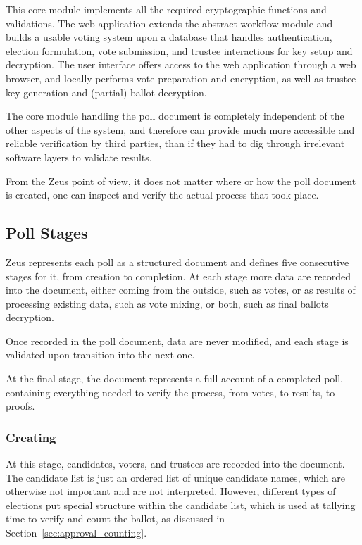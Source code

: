 \documentclass[letterpaper,10pt]{article}
\begin{document}
This core module implements all the required cryptographic functions and
validations. The web application extends the abstract workflow module
and builds a usable voting system upon a database
that handles authentication, election formulation, vote submission,
and trustee interactions for key setup and decryption.
The user interface offers access to the web application through
a web browser, and locally performs vote preparation and encryption,
as well as trustee key generation and (partial) ballot decryption.

The core module handling the poll document is completely independent of
the other aspects of the system, and therefore can provide much more
accessible and reliable verification by third parties, than if they
had to dig through irrelevant software layers to validate results.

From the Zeus point of view, it does not matter where or how the poll
document is created, one can inspect and verify the actual process
that took place.

\subsection{Poll Stages}
Zeus represents each poll as a structured document
and defines five consecutive stages for it, from creation to completion.
At each stage more data are recorded into the document,
either coming from the outside, such as votes,
or as results of processing existing data, such as vote mixing,
or both, such as final ballots decryption.

Once recorded in the poll document, data are never modified,
and each stage is validated upon transition into the next one.

At the final stage,
the document represents a full account of a completed poll,
containing everything needed to verify the process,
from votes, to results, to proofs.

\subsubsection{Creating}
\label{sec:creating}

At this stage, candidates, voters, and trustees
are recorded into the document.
The candidate list is just an ordered list of unique candidate names,
which are otherwise not important and are not interpreted.
However, different types of elections put special structure
within the candidate list, which is used at tallying time
to verify and count the ballot,
as discussed in Section~\ref{sec:approval_counting}.
\end{document}
